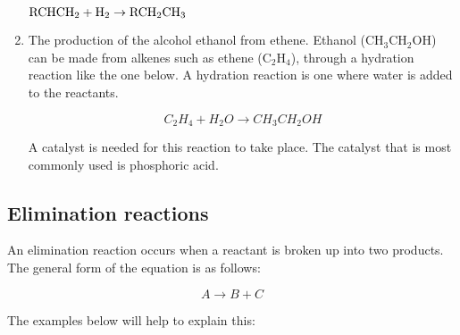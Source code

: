 \begin{enumerate}
{\begin{center}
$\rm{RCHCH_{2} + H_{2} \rightarrow RCH_{2}CH_{3}}$
\end{center}
}

\item{The production of the alcohol ethanol from ethene. Ethanol (CH$_{3}$CH$_{2}$OH) can be made from alkenes such as ethene (C$_{2}$H$_{4}$), through a hydration reaction like the one below. A hydration reaction is one where water is added to the reactants.

\begin{equation*}
C_{2}H_{4} + H_{2}O  \rightarrow CH_{3}CH_{2}OH
\end{equation*}

A catalyst is needed for this reaction to take place. The catalyst that is most commonly used is phosphoric acid.
}

\end{enumerate}


\subsection{Elimination reactions}

An elimination reaction occurs when a reactant is broken up into two products. The general form of the equation is as follows:

\begin{equation*}
A \rightarrow B + C
\end{equation*}

The examples below will help to explain this:

